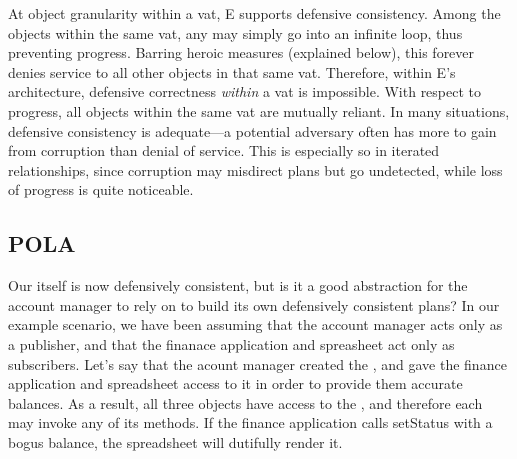 \documentclass{llncs}
\begin{document}

At object granularity within a vat, E supports defensive
consistency. Among the objects within the same vat, any may simply go
into an infinite loop, thus preventing progress. Barring heroic
measures (explained below),  this forever
denies service to all other objects in that same vat. Therefore,
within E's architecture, defensive correctness \emph{within} a vat is
impossible. With respect to progress, all objects within the same vat are
mutually reliant. In many situations, defensive consistency is
adequate---a potential adversary often has more to gain from
corruption than denial of service. This is especially so in iterated
relationships, since corruption may misdirect plans but go undetected,
while loss of progress is quite noticeable. 



\subsection{POLA}

Our  itself is now defensively consistent, but is
it a good abstraction for the account manager to rely on to build its
own defensively consistent plans? In our example scenario, we have
been assuming that the account manager acts only as a publisher, and
that the finanace application and spreasheet act only as
subscribers. Let's say that the acount manager created the
, and gave the finance application and spreadsheet
access to it in order to provide them accurate balances.  As a result,
all three objects have access to the , and
therefore each may invoke any of its methods. If the finance
application calls setStatus with a bogus balance, the spreadsheet will
dutifully render it.
\end{document}
